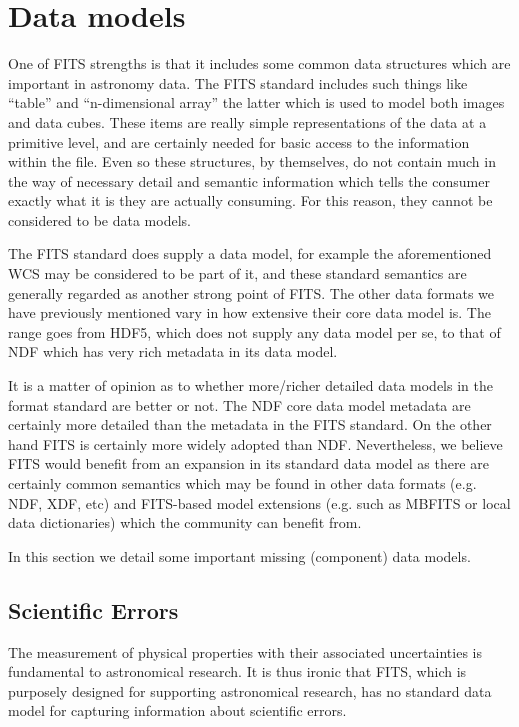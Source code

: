 \documentclass[final,authoryear,5p,times,twocolumn]{elsarticle}
\begin{document}
{{\section{Data models}
\label{section_crit_data_models}

One of FITS strengths is that it includes some common data structures
which are important in astronomy data. The FITS standard includes such
things like ``table'' and ``n-dimensional array'' the latter which is
used to model both images and data cubes.  These items are really simple
representations of the data at a primitive level, and are certainly
needed for basic access to the information within the file.  Even so
these structures, by themselves, do not contain much in the way of necessary
detail and semantic information which tells the consumer exactly what
it is they are actually consuming. For this reason, they cannot be considered to
be data models.


The FITS standard does supply a data model, for example the aforementioned
WCS may be considered to be part of it, and these standard semantics are generally
regarded as another strong point of FITS.  The other data formats we have
previously mentioned vary in how extensive their core data model is. The range
goes from HDF5, which does not supply any data model per se, to that of NDF
which has very rich metadata in its data model.


It is a matter of opinion as to whether more/richer detailed data models in the
format standard are better or not. The NDF core data model metadata are certainly
more detailed than the metadata in the FITS standard. On the other hand FITS is 
certainly more widely adopted than NDF. Nevertheless, we believe FITS would benefit 
from an expansion in its standard data model as there are certainly common semantics 
which may be found in other data formats (e.g. NDF, XDF, etc) and FITS-based model
extensions (e.g. such as MBFITS or local data dictionaries) which the community can 
benefit from.


In this section we detail some important missing (component) data models.


\subsection{Scientific Errors}


The measurement of physical properties with their associated uncertainties
is fundamental to astronomical
research. It is thus ironic that FITS, which is purposely designed for
supporting astronomical research, has no standard data model for
capturing information about scientific errors.


}}
\end{document}
